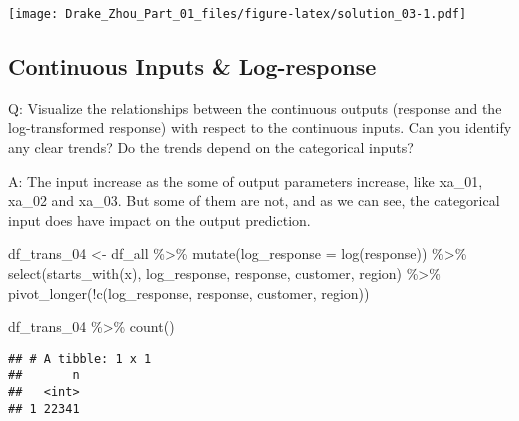 \documentclass[
]{article}
\newenvironment{Shaded}{\begin{snugshade}}{\end{snugshade}}
\newcommand{\AttributeTok}[1]{\textcolor[rgb]{0.77,0.63,0.00}{#1}}
\newcommand{\FunctionTok}[1]{\textcolor[rgb]{0.00,0.00,0.00}{#1}}
\newcommand{\NormalTok}[1]{#1}
\newcommand{\OtherTok}[1]{\textcolor[rgb]{0.56,0.35,0.01}{#1}}
\newcommand{\SpecialCharTok}[1]{\textcolor[rgb]{0.00,0.00,0.00}{#1}}
\newcommand{\StringTok}[1]{\textcolor[rgb]{0.31,0.60,0.02}{#1}}
\begin{document}
\texttt{[image: Drake\_Zhou\_Part\_01\_files/figure-latex/solution\_03-1.pdf]}

\hypertarget{continuous-inputs-log-response}{%
\subsection{Continuous Inputs \&
Log-response}\label{continuous-inputs-log-response}}

Q: Visualize the relationships between the continuous outputs (response
and the log-transformed response) with respect to the continuous inputs.
Can you identify any clear trends? Do the trends depend on the
categorical inputs?

A: The input increase as the some of output parameters increase, like
xa\_01, xa\_02 and xa\_03. But some of them are not, and as we can see,
the categorical input does have impact on the output prediction.

\begin{Shaded}
\begin{Highlighting}[]
\NormalTok{df\_trans\_04 }\OtherTok{\textless{}{-}}\NormalTok{ df\_all }\SpecialCharTok{\%\textgreater{}\%}
  \FunctionTok{mutate}\NormalTok{(}\AttributeTok{log\_response =} \FunctionTok{log}\NormalTok{(response)) }\SpecialCharTok{\%\textgreater{}\%}
  \FunctionTok{select}\NormalTok{(}\FunctionTok{starts\_with}\NormalTok{(}\StringTok{\textquotesingle{}x\textquotesingle{}}\NormalTok{), log\_response, response, customer, region) }\SpecialCharTok{\%\textgreater{}\%}
  \FunctionTok{pivot\_longer}\NormalTok{(}\SpecialCharTok{!}\FunctionTok{c}\NormalTok{(log\_response, response, customer, region))}

\NormalTok{df\_trans\_04 }\SpecialCharTok{\%\textgreater{}\%} \FunctionTok{count}\NormalTok{()}
\end{Highlighting}
\end{Shaded}

\begin{verbatim}
## # A tibble: 1 x 1
##       n
##   <int>
## 1 22341
\end{verbatim}
\end{document}
